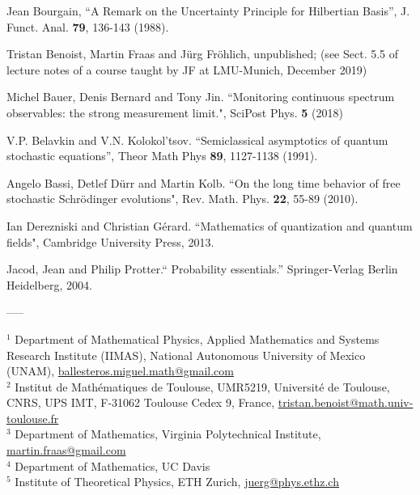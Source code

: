 \documentclass[12pt]{article}
\begin{document}
\begin{thebibliography}{99}
 Jean Bourgain, ``A Remark on the Uncertainty Principle for Hilbertian Basis'', J. Funct. Anal. {\bf{79}}, 136-143 (1988).

 Tristan Benoist, Martin Fraas and J\"urg Fr\"ohlich, unpublished; (see Sect. 5.5 of lecture notes of a course taught by JF at LMU-Munich, December 2019)

 Michel Bauer, Denis Bernard and Tony Jin. ``Monitoring continuous spectrum observables: the strong measurement limit.", SciPost Phys. {\bf{5}} (2018)

  V.P. Belavkin and V.N. Kolokol'tsov. ``Semiclassical asymptotics of quantum stochastic equations'', Theor Math Phys {\bf{89}}, 1127-1138 (1991).

 Angelo Bassi, Detlef D\"{u}rr and Martin Kolb. ``On the long time behavior of free stochastic Schr\"{o}dinger evolutions", Rev. Math. Phys. {\bf{22}}, 55-89 (2010).

 Ian Derezniski and Christian G\'erard. ``Mathematics of quantization and quantum fields", Cambridge University Press, 2013.

 Jacod, Jean and Philip Protter.`` Probability essentials.'' Springer-Verlag Berlin Heidelberg, 2004.
\end{thebibliography}

\begin{center}
-----
\end{center}


\bigskip


\noindent
$^{1}$ Department of Mathematical Physics, Applied Mathematics and Systems Research Institute (IIMAS),
National Autonomous University of Mexico (UNAM), \href{mailto:ballesteros.miguel.math@gmail.com}{ballesteros.miguel.math@gmail.com}
\\[0.3em]
$^{2}$ Institut de Mathématiques de Toulouse, UMR5219, Université de Toulouse, CNRS, UPS IMT, F-31062 Toulouse Cedex 9, France, \href{mailto:tristan.benoist@math.univ-toulouse.fr}{tristan.benoist@math.univ-toulouse.fr}
\\[0.3em]
$^{3}$ Department of Mathematics, Virginia Polytechnical Institute, \href{mailto:martin.fraas@gmail.com}{martin.fraas@gmail.com}
\\[0.3em]
$^{4}$ Department of Mathematics, UC Davis
\\[0.3em]
$^{5}$ Institute of Theoretical Physics, ETH Zurich, \href{mailto:juerg@phys.ethz.ch}{juerg@phys.ethz.ch}
\end{document}
